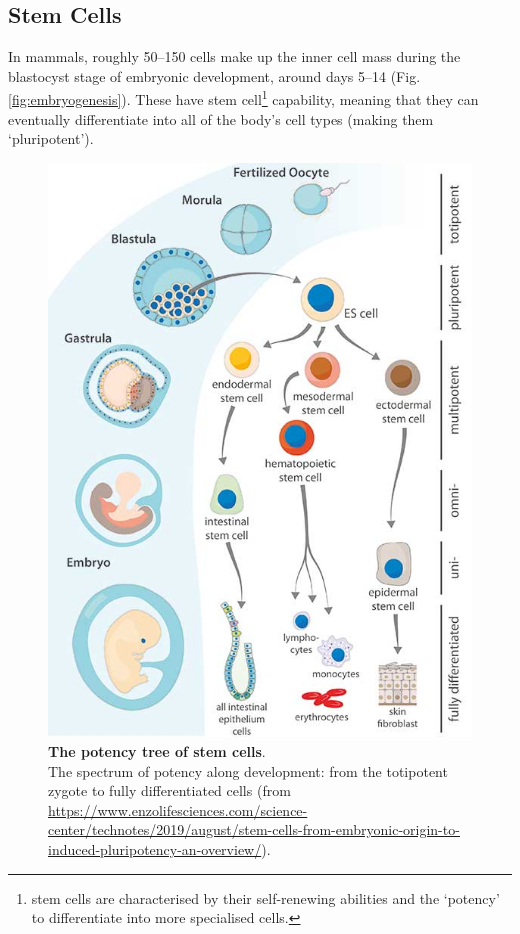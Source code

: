 \subsection{Stem Cells}
\label{sec:escs} 

In mammals, roughly 50–150 cells make up the inner cell mass during the blastocyst stage of embryonic development, around days 5–14 (Fig. \ref{fig:embryogenesis}). 
These have stem cell\footnote{stem cells are characterised by their self-renewing abilities and the `potency' to differentiate into more specialised cells.} capability, meaning that they can eventually differentiate into all of the body's cell types (making them `pluripotent').

\begin{figure}[htbp]
\centering
\includegraphics[width=13cm]{Chapter1/Fig/stem_cells.jpg}
\caption[Stem Cells]{\textbf{The potency tree of stem cells}.\\
The spectrum of potency along development: from the totipotent zygote to fully differentiated cells (from \url{https://www.enzolifesciences.com/science-center/technotes/2019/august/stem-cells-from-embryonic-origin-to-induced-pluripotency-an-overview/}).}
\label{fig:stem_cells}
\end{figure}


